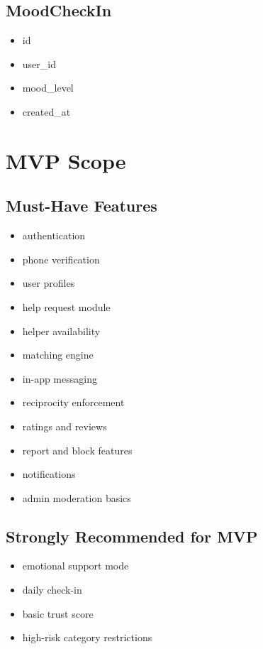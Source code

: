 \documentclass[11pt]{article}
\begin{document}
\subsection{MoodCheckIn}
\begin{itemize}[leftmargin=1.5em]
    \item id
    \item user\_id
    \item mood\_level
    \item created\_at
\end{itemize}

\section{MVP Scope}

\subsection{Must-Have Features}
\begin{itemize}[leftmargin=1.5em]
    \item authentication
    \item phone verification
    \item user profiles
    \item help request module
    \item helper availability
    \item matching engine
    \item in-app messaging
    \item reciprocity enforcement
    \item ratings and reviews
    \item report and block features
    \item notifications
    \item admin moderation basics
\end{itemize}

\subsection{Strongly Recommended for MVP}
\begin{itemize}[leftmargin=1.5em]
    \item emotional support mode
    \item daily check-in
    \item basic trust score
    \item high-risk category restrictions
\end{itemize}
\end{document}
